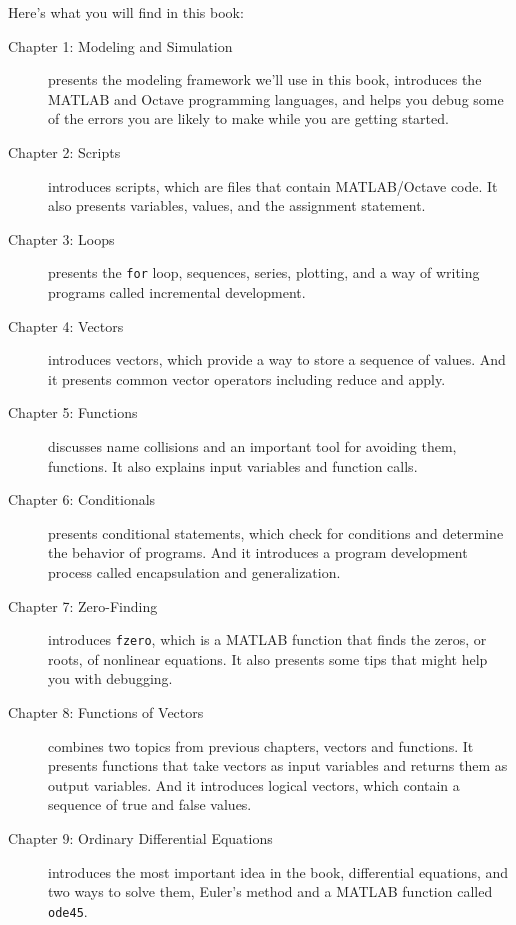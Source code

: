 Here's what you will find in this book:
\begin{description}
\item [Chapter 1: Modeling and Simulation] presents the modeling framework we'll use in this book, introduces the MATLAB and Octave programming languages, and helps you debug some of the errors you are likely to make while you are getting started.

\item [Chapter 2: Scripts] introduces scripts, which are files that contain MATLAB/Octave code.  It also presents variables, values, and the assignment statement.

\item [Chapter 3: Loops] presents the \lstinline{for} loop, sequences, series, plotting, and a way of writing programs called incremental development.

\item [Chapter 4: Vectors] introduces vectors, which provide a way to store a sequence of values.  And it presents common vector operators including reduce and apply.

\item [Chapter 5: Functions] discusses name collisions and an important tool for avoiding them, functions.  It also explains input variables and function calls.

\item [Chapter 6: Conditionals] presents conditional statements, which check for conditions and determine the behavior of programs.  And it introduces a program development process called encapsulation and generalization.

\item [Chapter 7: Zero-Finding] introduces \lstinline{fzero}, which is a MATLAB function that finds the zeros, or roots, of nonlinear equations.  It also presents some tips that might help you with debugging.

\item [Chapter 8: Functions of Vectors] combines two topics from previous chapters, vectors and functions.  It presents functions that take vectors as input variables and returns them as output variables.  And it introduces logical vectors, which contain a sequence of true and false values.

\item [Chapter 9: Ordinary Differential Equations] introduces the most important idea in the book, differential equations, and two ways to solve them, Euler's method and a MATLAB function called \lstinline{ode45}.


\end{description}
